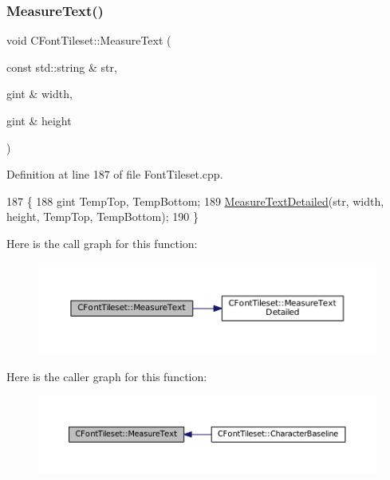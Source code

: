 \subsubsection{\texorpdfstring{Measure\+Text()}{MeasureText()}}
{\footnotesize\ttfamily void C\+Font\+Tileset\+::\+Measure\+Text (\begin{DoxyParamCaption}\item[{const std\+::string \&}]{str,  }\item[{gint \&}]{width,  }\item[{gint \&}]{height }\end{DoxyParamCaption})}



Definition at line 187 of file Font\+Tileset.\+cpp.


\begin{DoxyCode}
187                                                                              \{
188     gint TempTop, TempBottom;
189     \hyperlink{classCFontTileset_a7afa08157a6bea6c0fbd06299685b8b3}{MeasureTextDetailed}(str, width, height, TempTop, TempBottom);
190 \}
\end{DoxyCode}
Here is the call graph for this function\+:\nopagebreak
\begin{figure}[H]
\begin{center}
\leavevmode
\includegraphics[width=350pt]{classCFontTileset_ad6902d89c94a309fb487d4dbdec97a15_cgraph}
\end{center}
\end{figure}
Here is the caller graph for this function\+:\nopagebreak
\begin{figure}[H]
\begin{center}
\leavevmode
\includegraphics[width=350pt]{classCFontTileset_ad6902d89c94a309fb487d4dbdec97a15_icgraph}
\end{center}
\end{figure}
\hypertarget{classCFontTileset_a7afa08157a6bea6c0fbd06299685b8b3}{}\label{classCFontTileset_a7afa08157a6bea6c0fbd06299685b8b3} 
